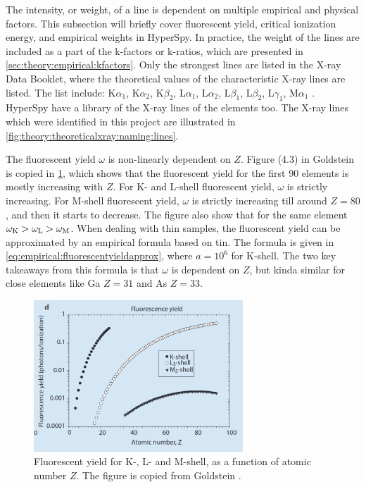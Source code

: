 The intensity, or weight, of a line is dependent on multiple empirical and physical factors.
This subsection will briefly cover fluorescent yield, critical ionization energy, and empirical weights in HyperSpy.
In practice, the weight of the lines are included as a part of the k-factors or k-ratios, which are presented in \cref{sec:theory:empirical:kfactors}.
Only the strongest lines are listed in the X-ray Data Booklet, where the theoretical values of the characteristic X-ray lines are listed.
The list include: K$\alpha_1$, K$\alpha_2$, K$\beta_2$, L$\alpha_1$, L$\alpha_2$, L$\beta_1$, L$\beta_2$, L$\gamma_1$, M$\alpha_1$ \cite{thompson_x-ray_2004}.
HyperSpy have a library of the X-ray lines of the elements too.
The X-ray lines which were identified in this project are illustrated in \cref{fig:theory:theoreticalxray:naming:lines}.












The fluorescent yield $\omega$ is non-linearly dependent on $Z$.
Figure (4.3) in Goldstein \cite{goldstein_scanning_2018} is copied in \cref{fig:theory:fluorescence_yield}, which shows that the fluorescent yield for the first 90 elements is mostly increasing with $Z$.
For K- and L-shell fluorescent yield, $\omega$ is strictly increasing.
For M-shell fluorescent yield, $\omega$ is strictly increasing till around $Z=80$, and then it starts to decrease.
The figure also show that for the same element $\omega_{\textnormal{K}}  > \omega_{\textnormal{L}} > \omega_{\textnormal{M}}$.
When dealing with thin samples, the fluorescent yield can be approximated by an empirical formula based on tin.
The formula is given in \cref{eq:empirical:fluorescentyieldapprox}, where $a=10^6$ for K-shell.
The two key takeaways from this formula is that $\omega$ is dependent on $Z$, but kinda similar for close elements like Ga $Z = 31$ and As $Z = 33$.

\begin{figure}[h]
    \centering
    \includegraphics[width=0.7\textwidth]{figures/fluorescence_yield_Goldstein_Fig4-3-d.png}
    \caption{
        Fluorescent yield for K-, L- and M-shell, as a function of atomic number $Z$.
        The figure is copied from Goldstein \cite[Fig. 4.3 (d)]{goldstein_scanning_2018}.
    }
    \label{fig:theory:fluorescence_yield}
\end{figure}



